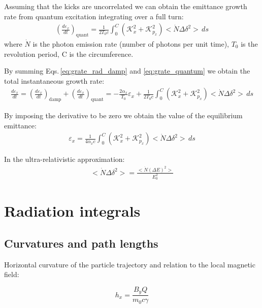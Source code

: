 Assuming that the kicks are uncorrelated we can obtain the emittance growth rate from quantum excitation integrating over a full turn:
\begin{align}
\left(\frac {d\varepsilon_x}{dt} \right)_\text{quant}= 
\frac{1}{2T_0c}\int_0^C\left(\mathcal{K}^2_x + \mathcal{K}^2_{p_x}\right)<\dot{N} \Delta \delta^2> \,ds
\label{eq:grate_quantum}
\end{align}
where $\dot{N}$ is the photon emission rate (number of photons per unit time), $T_0$ is the revolution period, C is the circumference.

By summing Eqs.\,\ref{eq:grate_rad_damp} and \ref{eq:grate_quantum} we obtain the total instantaneous growth rate:
\begin{align}
\frac {d\varepsilon_x}{dt} = 
\left(\frac {d\varepsilon_x}{dt}\right)_\text{damp}
+
\left(\frac {d\varepsilon_x}{dt}\right)_\text{quant}
=
- \frac{2\alpha_x}{T_0}  \varepsilon_x
+
\frac{1}{2T_0c}\int_0^C\left(\mathcal{K}^2_x + \mathcal{K}^2_{p_x}\right)<\dot{N} \Delta \delta^2> \,ds
\end{align}

By imposing the derivative to be zero we obtain the value of the equilibrium emittance:
\begin{align}
\varepsilon_x= 
\frac{1}{4\alpha_xc}\int_0^C\left(\mathcal{K}^2_x + \mathcal{K}^2_{p_x}\right)<\dot{N} \Delta \delta^2> \,ds
\label{eq:equilemi1}
\end{align}

In the ultra-relativistic approximation:
\begin{align}
<\dot{N} \Delta \delta^2> = 
\frac{<\dot{N} (\Delta E)^2>}{E_0^2}
\label{eq:equilemi2}
\end{align}

\section{Radiation integrals}

\subsection{Curvatures and path lengths}


Horizontal curvature of the particle trajectory and relation to the local magnetic field:

\begin{equation}
    h_x = \frac{B_y Q}{m_0 c \gamma}
    \label{eq:curvx}
\end{equation}

